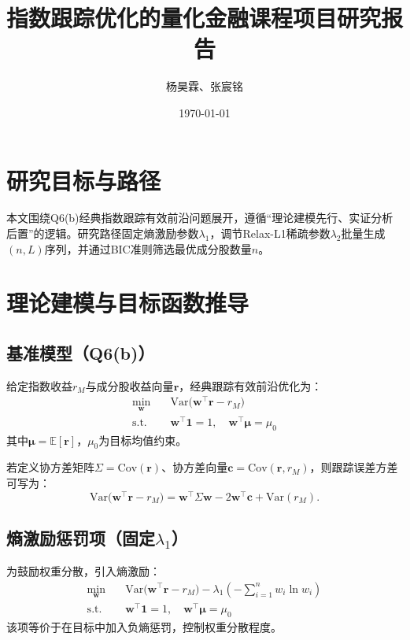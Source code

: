 \documentclass[UTF8]{ctexart}
\title{指数跟踪优化的量化金融课程项目研究报告}
\author{杨昊霖、张宸铭}
\date{\today}
\begin{document}
\maketitle

\section{研究目标与路径}
本文围绕Q6(b)经典指数跟踪有效前沿问题展开，遵循“理论建模先行、实证分析后置”的逻辑。研究路径固定熵激励参数$\lambda_1$，调节Relax-L1稀疏参数$\lambda_2$批量生成$(n,L)$序列，并通过BIC准则筛选最优成分股数量$n$。

\section{理论建模与目标函数推导}
\subsection{基准模型（Q6(b)）}
给定指数收益$r_M$与成分股收益向量$\boldsymbol{r}$，经典跟踪有效前沿优化为：
\begin{align*}
\min_{\boldsymbol{w}} \quad & \mathrm{Var}\big(\boldsymbol{w}^\top \boldsymbol{r} - r_M\big) \\
\text{s.t.} \quad & \boldsymbol{w}^\top \boldsymbol{1} = 1,\quad \boldsymbol{w}^\top \boldsymbol{\mu} = \mu_0
\end{align*}
其中$\boldsymbol{\mu}=\mathbb{E}[\boldsymbol{r}]$，$\mu_0$为目标均值约束。

若定义协方差矩阵$\Sigma=\mathrm{Cov}(\boldsymbol{r})$、协方差向量$\boldsymbol{c}=\mathrm{Cov}(\boldsymbol{r},r_M)$，则跟踪误差方差可写为：
\[
\mathrm{Var}\big(\boldsymbol{w}^\top \boldsymbol{r} - r_M\big)=\boldsymbol{w}^\top \Sigma \boldsymbol{w}-2\boldsymbol{w}^\top \boldsymbol{c}+\mathrm{Var}(r_M).
\]

\subsection{熵激励惩罚项（固定$\lambda_1$）}
为鼓励权重分散，引入熵激励：
\begin{align*}
\min_{\boldsymbol{w}} \quad & \mathrm{Var}\big(\boldsymbol{w}^\top \boldsymbol{r} - r_M\big) - \lambda_1 \left(-\sum_{i=1}^n w_i\ln w_i\right) \\
\text{s.t.} \quad & \boldsymbol{w}^\top \boldsymbol{1} = 1,\quad \boldsymbol{w}^\top \boldsymbol{\mu} = \mu_0
\end{align*}
该项等价于在目标中加入负熵惩罚，控制权重分散程度。
\end{document}
